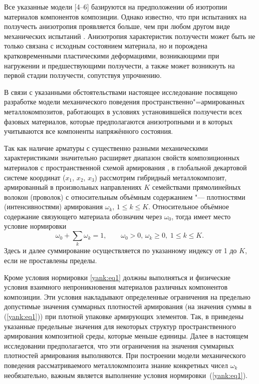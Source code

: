 Все указанные модели [4--6] базируются на предположении об
изотропии материалов компонентов композиции. Однако известно, что
при испытаниях на ползучесть анизотропия проявляется больше, чем
при любом другом виде механических испытаний \cite{yank:bib3}.
Анизотропия характеристик ползучести может быть не только связана 
с исходным состоянием материала, но и порождена кратковременными
пластическими деформациями, возникающими при нагружении и
предшествующими ползучести, а также может возникнуть на первой
стадии ползучести, сопутствуя упрочнению.

В связи с указанными обстоятельствами настоящее исследование посвящено
разработке модели механического поведения пространственно"=армированных
металлокомпозитов, работающих в условиях установившейся ползучести всех
фазовых материалов, которые предполагаются анизотропными и в которых
учитываются все компоненты напряжённого состояния.

\smallskip

 Так как наличие арматуры с существенно
разными механическими характеристиками значительно расширяет
диапазон свойств композиционных материалов с пространственной
схемой армирования \cite{yank:bib1}, в глобальной декартовой
системе координат ($x_1$, $x_2$, $x_3 $) рассмотрим гибридный
металлокомпозит, армированный в произвольных направлениях $K$
семействами прямолинейных волокон (проволок) с относительным
объёмным содержанием "--- плотностями (интенсивностями)
армирования $\omega _k $, $1\le k\le K$.
Относительное объёмное содержание связующего материала обозначим
через $\omega _0$, тогда имеет место условие нормировки
\begin{equation}
\label{yank:eq1}
\omega _0 +\sum\limits_k \omega_k
=1,\qquad \omega _0>0,\,\omega _k \ge 0,\; 1\le k\le K.
\end{equation}
Здесь и далее суммирование осуществляется по указанному индексу от 1 до $K$,
если не проставлены пределы.

Кроме условия нормировки \eqref{yank:eq1} должны выполняться и физические условия
взаимного непроникновения материалов различных компонентов композиции. Эти
условия накладывают определенные ограничения на предельно допустимые
значения суммарных плотностей армирования (на значения суммы в (\ref{yank:eq1})) при
плотной упаковке армирующих элементов. Так, в \cite{yank:bib1} приведены указанные
предельные значения для некоторых структур пространственного армирования
композитной среды, которые меньше единицы. Далее в настоящем исследовании
предполагается, что эти ограничения на значения суммарных плотностей
армирования выполняются. При построении модели механического поведения
рассматриваемого металлокомпозита знание конкретных чисел $\omega _k$
необязательно, важным является выполнение условия нормировки~(\ref{yank:eq1}).

